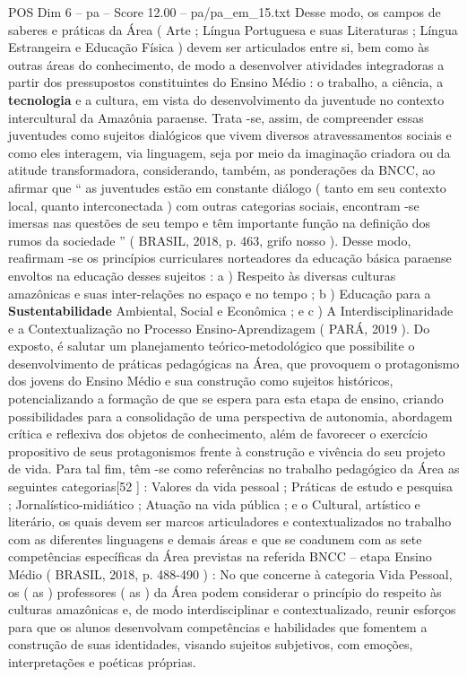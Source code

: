 \begin{textsample}{POS Dim 6 – pa – Score 12.00 – pa/pa\_em\_15.txt}
Desse modo, os campos de saberes e práticas da Área ( Arte ; Língua Portuguesa e suas Literaturas ; Língua Estrangeira e Educação Física ) devem ser articulados entre si, bem como às outras áreas do conhecimento, de modo a desenvolver atividades integradoras a partir dos pressupostos constituintes do Ensino Médio : o trabalho, a ciência, a \textbf{tecnologia} e a cultura, em vista do desenvolvimento da juventude no contexto intercultural da Amazônia paraense.
Trata -se, assim, de compreender essas juventudes como sujeitos dialógicos que vivem diversos atravessamentos sociais e como eles interagem, via linguagem, seja por meio da imaginação criadora ou da atitude transformadora, considerando, também, as ponderações da BNCC, ao afirmar que “ as juventudes estão em constante diálogo ( tanto em seu contexto local, quanto interconectada ) com outras categorias sociais, encontram -se imersas nas questões de seu tempo e têm importante função na definição dos rumos da sociedade ” ( BRASIL, 2018, p. 463, grifo nosso ).
Desse modo, reafirmam -se os princípios curriculares norteadores da educação básica paraense envoltos na educação desses sujeitos : a ) Respeito às diversas culturas amazônicas e suas inter-relações no espaço e no tempo ; b ) Educação para a \textbf{Sustentabilidade} Ambiental, Social e Econômica ; e c ) A Interdisciplinaridade e a Contextualização no Processo Ensino-Aprendizagem ( PARÁ, 2019 ).
Do exposto, é salutar um planejamento teórico-metodológico que possibilite o desenvolvimento de práticas pedagógicas na Área, que provoquem o protagonismo dos jovens do Ensino Médio e sua construção como sujeitos históricos, potencializando a formação de que se espera para esta etapa de ensino, criando possibilidades para a consolidação de uma perspectiva de autonomia, abordagem crítica e reflexiva dos objetos de conhecimento, além de favorecer o exercício propositivo de seus protagonismos frente à construção e vivência do seu projeto de vida.
Para tal fim, têm -se como referências no trabalho pedagógico da Área as seguintes categorias[52 ] : Valores da vida pessoal ; Práticas de estudo e pesquisa ; Jornalístico-midiático ; Atuação na vida pública ; e o Cultural, artístico e literário, os quais devem ser marcos articuladores e contextualizados no trabalho com as diferentes linguagens e demais áreas e que se coadunem com as sete competências específicas da Área previstas na referida BNCC – etapa Ensino Médio ( BRASIL, 2018, p. 488-490 ) : No que concerne à categoria Vida Pessoal, os ( as ) professores ( as ) da Área podem considerar o princípio do respeito às culturas amazônicas e, de modo interdisciplinar e contextualizado, reunir esforços para que os alunos desenvolvam competências e habilidades que fomentem a construção de suas identidades, visando sujeitos subjetivos, com emoções, interpretações e poéticas próprias.

\end{textsample}
